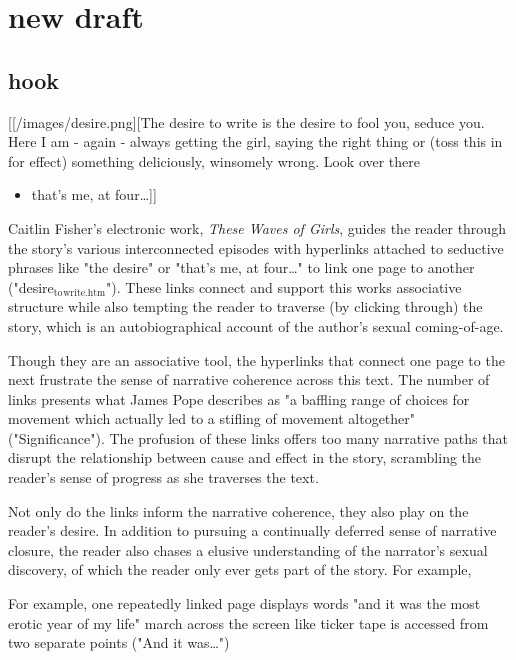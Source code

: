 \documentclass[11pt]{article}
\author{Filipa  Calado}
\date{\today}
\title{}
\begin{document}
\tableofcontents

\section{new draft}
\label{sec:org5e0f692}

\subsection{hook}
\label{sec:org97695f1}

[[/images/desire.png][The desire to write is the desire to fool you, seduce you. Here I am -
again - always getting the girl, saying the right thing or (toss this
in for effect) something deliciously, winsomely wrong. Look over there
\begin{itemize}
\item that's me, at four\ldots{}]]
\end{itemize}

Caitlin Fisher's electronic work, \emph{These Waves of Girls}, guides the
reader through the story's various interconnected episodes with
hyperlinks attached to seductive phrases like "the desire" or "that's
me, at four\ldots{}" to link one page to another
("desire\(_{\text{to}}\)\(_{\text{write.htm}}\)"). These links connect and support this works
associative structure while also tempting the reader to traverse (by
clicking through) the story, which is an autobiographical account of
the author's sexual coming-of-age.

Though they are an associative tool, the hyperlinks that connect one
page to the next frustrate the sense of narrative coherence across
this text. The number of links presents what James Pope describes as
"a baffling range of choices for movement which actually led to a
stifling of movement altogether" ("Significance"). The profusion of
these links offers too many narrative paths that disrupt the
relationship between cause and effect in the story, scrambling the
reader's sense of progress as she traverses the text.

Not only do the links inform the narrative coherence, they also play
on the reader's desire. In addition to pursuing a continually deferred
sense of narrative closure, the reader also chases a elusive
understanding of the narrator's sexual discovery, of which the reader
only ever gets part of the story. For example, 

For example, one repeatedly linked page displays words "and it was the
most erotic year of my life" march across the screen like ticker tape
is accessed from two separate points ("And it was…") 
\end{document}
